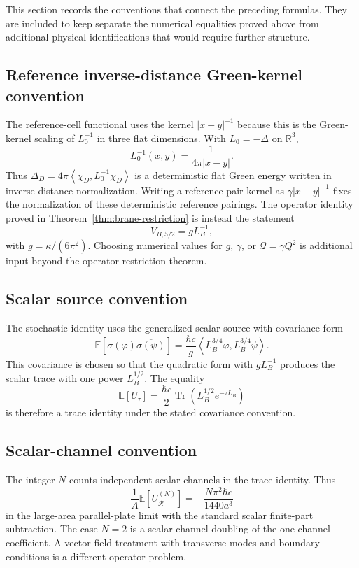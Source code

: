 \documentclass[11pt]{article}
\newcommand{\R}{\mathbb{R}}
\newcommand{\E}{\mathbb{E}}
\newcommand{\Tr}{\operatorname{Tr}}
\newcommand{\braket}[2]{\left\langle #1,#2\right\rangle}
\begin{document}
This section records the conventions that connect the preceding formulas.  They are included to keep separate the numerical equalities proved above from additional physical identifications that would require further structure.

\subsection{Reference inverse-distance Green-kernel convention}

The reference-cell functional uses the kernel \(|x-y|^{-1}\) because this is
the Green-kernel scaling of \(L_0^{-1}\) in three flat dimensions.  With
\(L_0=-\Delta\) on \(\R^3\),
\[
    L_0^{-1}(x,y)=\frac{1}{4\pi|x-y|}.
\]
Thus \(\Delta_D=4\pi\braket{\chi_D}{L_0^{-1}\chi_D}\) is a deterministic
flat Green energy written in inverse-distance normalization.  Writing a
reference pair kernel as \(\gamma |x-y|^{-1}\) fixes the normalization of
these deterministic reference pairings.  The operator identity proved in
Theorem~\ref{thm:brane-restriction} is instead the statement
\[
    V_{B,5/2}=gL_B^{-1},
\]
with \(g=\kappa/(6\pi^2)\).  Choosing numerical values for \(g\), \(\gamma\),
or \(\mathcal Q=\gamma Q^2\) is additional input beyond the operator
restriction theorem.

\subsection{Scalar source convention}

The stochastic identity uses the generalized scalar source with covariance form
\[
    \E[\sigma(\varphi)\overline{\sigma(\psi)}]
    =\frac{\hbar c}{g}\braket{L_B^{3/4}\varphi}{L_B^{3/4}\psi}.
\]
This covariance is chosen so that the quadratic form with $gL_B^{-1}$ produces the scalar trace with one power $L_B^{1/2}$.  The equality
\[
    \E[U_\tau]
    =\frac{\hbar c}{2}\Tr(L_B^{1/2}e^{-\tau L_B})
\]
is therefore a trace identity under the stated covariance convention.

\subsection{Scalar-channel convention}

The integer $N$ counts independent scalar channels in the trace identity.  Thus
\[
    \frac{1}{A}\E[U_{\mathcal R}^{(N)}]
    =-\frac{N\pi^2\hbar c}{1440a^3}
\]
in the large-area parallel-plate limit with the standard scalar finite-part subtraction.  The case $N=2$ is a scalar-channel doubling of the one-channel coefficient.  A vector-field treatment with transverse modes and boundary conditions is a different operator problem.
\end{document}
